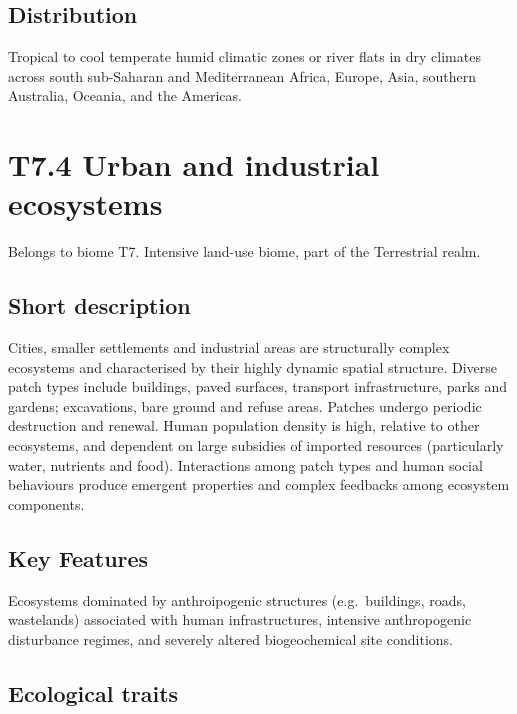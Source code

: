 \documentclass[
  letterpaper,
  DIV=11,
  numbers=noendperiod]{scrartcl}
\begin{document}
\subsection{Distribution}\label{distribution-100}

Tropical to cool temperate humid climatic zones or river flats in dry
climates across south sub-Saharan and Mediterranean Africa, Europe,
Asia, southern Australia, Oceania, and the Americas.

\section{T7.4 Urban and industrial
ecosystems}\label{t7.4-urban-and-industrial-ecosystems}

Belongs to biome T7. Intensive land-use biome, part of the Terrestrial
realm.

\subsection{Short description}\label{short-description-101}

Cities, smaller settlements and industrial areas are structurally
complex ecosystems and characterised by their highly dynamic spatial
structure. Diverse patch types include buildings, paved surfaces,
transport infrastructure, parks and gardens; excavations, bare ground
and refuse areas. Patches undergo periodic destruction and renewal.
Human population density is high, relative to other ecosystems, and
dependent on large subsidies of imported resources (particularly water,
nutrients and food). Interactions among patch types and human social
behaviours produce emergent properties and complex feedbacks among
ecosystem components.

\subsection{Key Features}\label{key-features-101}

Ecosystems dominated by anthroipogenic structures (e.g.~buildings,
roads, wastelands) associated with human infrastructures, intensive
anthropogenic disturbance regimes, and severely altered biogeochemical
site conditions.

\subsection{Ecological traits}\label{ecological-traits-101}
\end{document}
